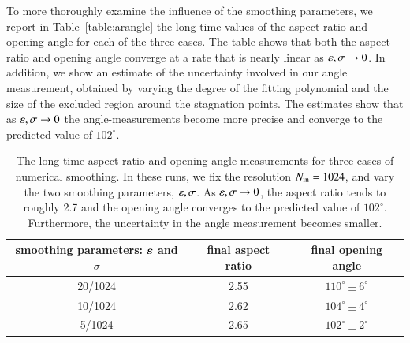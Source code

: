 \documentclass[preprint, 10pt]{elsarticle}
\begin{document}
To more thoroughly examine the influence of the smoothing parameters, we report in Table~\ref{table:arangle} the long-time values of the aspect ratio and opening angle for each of the three cases. The table shows that both the aspect ratio and opening angle converge at a rate that is nearly linear as $\varepsilon, \sigma \to 0$. In addition, we show an estimate of the uncertainty involved in our angle measurement, obtained by varying the degree of the fitting polynomial and the size of the excluded region around the stagnation points. The estimates show that as $\varepsilon, \sigma \to 0$ the angle-measurements become more precise and converge to the predicted value of $102^{\circ}$.  

\begin{table}%
\begin{center}
\caption{The long-time aspect ratio and opening-angle measurements for three cases of numerical smoothing. In these runs, we fix the resolution $N_{\mathrm{in}} = 1024$, and vary the two smoothing parameters, $\varepsilon, \sigma$. As $\varepsilon, \sigma \to 0$, the aspect ratio tends to roughly 2.7 and the opening angle converges to the predicted value of $102^{\circ}$. Furthermore, the uncertainty in the angle measurement becomes smaller.
} 
\vspace{0.3 pc}
\begin{tabular}{c c c}
\hline
\hspace{0.5pc} smoothing parameters: $\varepsilon$ and $\sigma$
\hspace{0.5pc} & final aspect ratio 
\hspace{0.5pc} & final opening angle \\
\hline
20/1024		& 2.55	& $110^\circ \pm 6^\circ$	\\
10/1024		& 2.62	& $104^\circ \pm 4^\circ$	\\
5/1024		& 2.65	& $102^\circ \pm 2^\circ$	\\
\hline
\end{tabular}
\end{center}
\end{table}
\end{document}
